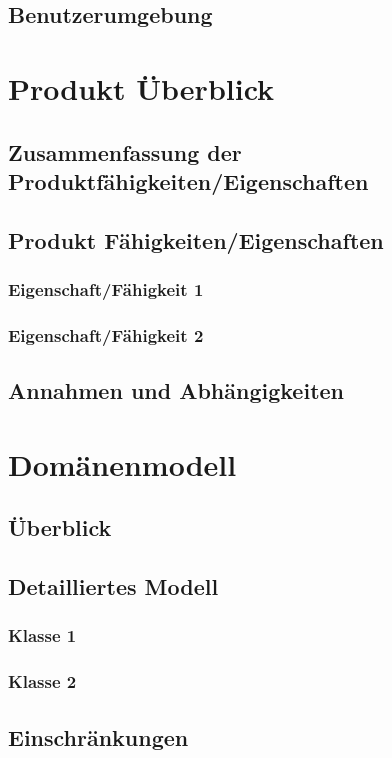 \documentclass[a4paper,12pt,twoside]{scrreprt}
\begin{document}
    \section{Benutzerumgebung}

    \chapter{Produkt Überblick}
    \section{Zusammenfassung der Produktfähigkeiten/Eigenschaften}
    \section{Produkt Fähigkeiten/Eigenschaften}
    \subsection{Eigenschaft/Fähigkeit 1}
    \subsection{Eigenschaft/Fähigkeit 2}


    \section{Annahmen und Abhängigkeiten}

    \chapter{Domänenmodell}
    \section{Überblick}
    \section{Detailliertes Modell}
    \subsection{Klasse 1}
    \subsection{Klasse 2}

    \section{Einschränkungen}
\end{document}
